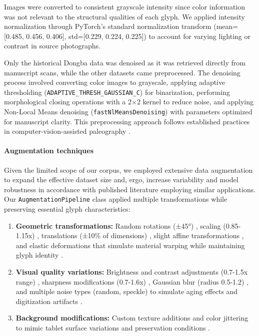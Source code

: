 \documentclass[11pt,a4paper,oneside]{report}
\begin{document}
Images were converted to consistent grayscale intensity since color information was not relevant to the structural qualities of each glyph. We applied intensity normalization through PyTorch's standard normalization transform (mean=[0.485, 0.456, 0.406], std=[0.229, 0.224, 0.225]) to account for varying lighting or contrast in source photographs. 

Only the historical Dongba data was denoised as it was retrieved directly from manuscript scans, while the other datasets came preprocessed. The denoising process involved converting color images to grayscale, applying adaptive thresholding (\texttt{ADAPTIVE\_THRESH\_GAUSSIAN\_C}) for binarization, performing morphological closing operations with a 2$\times$2 kernel to reduce noise, and applying Non-Local Means denoising (\texttt{fastNlMeansDenoising}) with parameters optimized for manuscript clarity. This preprocessing approach follows established practices in computer-vision-assisted paleography \cite{daggumati_convolutional_2023}.

\paragraph{Augmentation techniques}Given the limited scope of our corpus, we employed extensive data augmentation to expand the effective dataset size and, ergo, increase variability and model robustness in accordance with published literature employing similar applications. Our \texttt{AugmentationPipeline} class applied multiple transformations while preserving essential glyph characteristics:

\begin{enumerate}
    \item \textbf{Geometric transformations:} Random rotations (±45°) \cite{krizhevsky_imagenet_2017}, scaling (0.85-1.15x) \cite{simard_best_2003}, translations (±10\% of dimensions) \cite{hutchison_evaluation_2010}, slight affine transformations \cite{perez_effectiveness_2017}, and elastic deformations that simulate material warping while maintaining glyph identity \cite{simard_best_2003}.
    \item \textbf{Visual quality variations:} Brightness and contrast adjustments (0.7-1.5x range) \cite{simard_best_2003}, sharpness modifications (0.7-1.6x) \cite{simard_best_2003}, Gaussian blur (radius 0.5-1.2) \cite{simard_best_2003}, and multiple noise types (random, speckle) to simulate aging effects and digitization artifacts \cite{hutchison_evaluation_2010}.
    \item \textbf{Background modifications:} Custom texture additions and color jittering to mimic tablet surface variations and preservation conditions \cite{simard_best_2003} \cite{krizhevsky_imagenet_2017}.
\end{enumerate}
\end{document}
